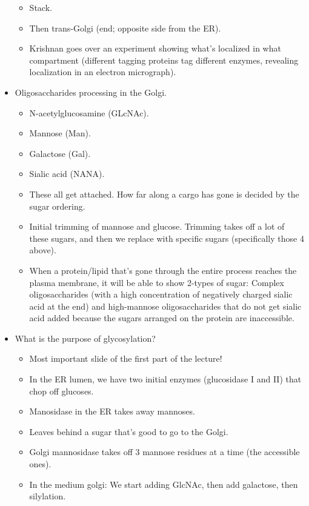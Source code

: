 \documentclass[../notes.tex]{subfiles}
\begin{document}
\begin{itemize}
\begin{itemize}
        \item Stack.
        \item Then trans-Golgi (end; opposite side from the ER).
        \item Krishnan goes over an experiment showing what's localized in what compartment (different tagging proteins tag different enzymes, revealing localization in an electron micrograph).
    \end{itemize}
    \item Oligosaccharides processing in the Golgi.
    \begin{itemize}
        \item N-acetylglucosamine (GLcNAc).
        \item Mannose (Man).
        \item Galactose (Gal).
        \item Sialic acid (NANA).
        \item These all get attached. How far along a cargo has gone is decided by the sugar ordering.
        \item Initial trimming of mannose and glucose. Trimming takes off a lot of these sugars, and then we replace with specific sugars (specifically those 4 above).
        \item When a protein/lipid that's gone through the entire process reaches the plasma membrane, it will be able to show 2-types of sugar: Complex oligosaccharides (with a high concentration of negatively charged sialic acid at the end) and high-mannose oligosaccharides that do not get sialic acid added because the sugars arranged on the protein are inaccessible.
    \end{itemize}
    \item What is the purpose of glycosylation?
    \begin{itemize}
        \item Most important slide of the first part of the lecture!
        \item In the ER lumen, we have two initial enzymes (glucosidase I and II) that chop off glucoses.
        \item Manosidase in the ER takes away mannoses.
        \item Leaves behind a sugar that's good to go to the Golgi.
        \item Golgi mannosidase takes off 3 mannose residues at a time (the accessible ones).
        \item In the medium golgi: We start adding GlcNAc, then add galactose, then silylation.

\end{itemize}
\end{itemize}
\end{document}
